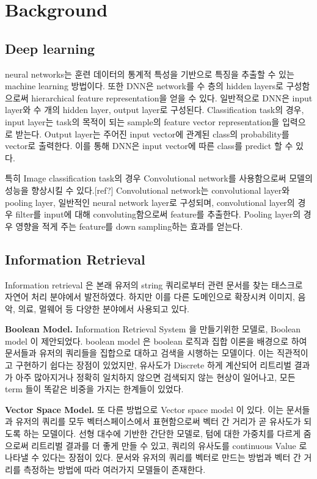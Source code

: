 \section{Background}


\subsection{Deep learning }

 neural networks는 훈련 데이터의 통계적 특성을 기반으로 특징을 추출할 수 있는 machine learning 방법이다. 또한 DNN은 network를 수 층의 hidden layers로 구성함으로써 hierarchical feature representation을 얻을 수 있다. 일반적으로 DNN은 input layer와 수 개의 hidden layer, output layer로 구성된다. Classification task의 경우, input layer는 task의 목적이 되는 sample의 feature vector representation을 입력으로 받는다. Output layer는 주어진 input vector에 관계된 class의 probability를 vector로 출력한다. 이를 통해 DNN은 input vector에 따른 class를 predict 할 수 있다.
 
특히 Image classification task의 경우 Convolutional network를 사용함으로써 모델의 성능을 향상시킬 수 있다.[ref?] Convolutional network는 convolutional layer와 pooling layer, 일반적인 neural network layer로 구성되며, convolutional layer의 경우 filter를 input에 대해 convoluting함으로써 feature를 추출한다. Pooling layer의 경우 영향을 적게 주는 feature를 down sampling하는 효과를 얻는다.


\subsection{Information Retrieval}
Information retrieval 은 본래 유저의 string  쿼리로부터 관련 문서를 찾는 태스크로 자연어 처리 분야에서 발전하였다. 하지만 이를 다른 도메인으로 확장시켜 이미지\cite{datta2008image, yu2015learning}, 음악\cite{schedl2014music}, 의료\cite{goeuriot2016medical, mourao2015multimodal}, 멀웨어\cite{santos2013noa} 등 다양한 분야에서 사용되고 있다. 

\textbf{Boolean Model. }Information Retrieval System 을 만들기위한 모델로, Boolean model 이 제안되었다. boolean model 은 boolean 로직과 집합 이론을 배경으로 하여 문서들과 유저의 쿼리들을 집합으로 대하고 검색을 시행하는 모델이다. 이는 직관적이고 구현하기 쉽다는 장점이 있었지만, 유사도가 Discrete 하게 계산되어 리트리벌 결과가 아주 많아지거나 정확히 일치하지 않으면 검색되지 않는 현상이 일어나고, 모든 term 들이 똑같은 비중을 가지는 한계들이 있었다.\cite{lashkari2009boolean, } 


\textbf{Vector Space Model.} 또 다른 방법으로 Vector space model 이 있다. 이는 문서들과 유저의 쿼리를 모두 벡터스페이스에서 표현함으로써 벡터 간 거리가 곧 유사도가 되도록 하는 모델이다. 선형 대수에 기반한 간단한 모델로, 텀에 대한 가중치를 다르게 줌으로써 리트리벌 결과를 더 좋게 만들 수 있고, 쿼리의 유사도를 continuous Value 로 나타낼 수 있다는 장점이 있다.\cite{salton1975vector} 문서와 유저의 쿼리를 벡터로 만드는 방법\cite{}과 벡터 간 거리를 측정하는 방법\cite{}에 따라 여러가지 모델들이 존재한다.


